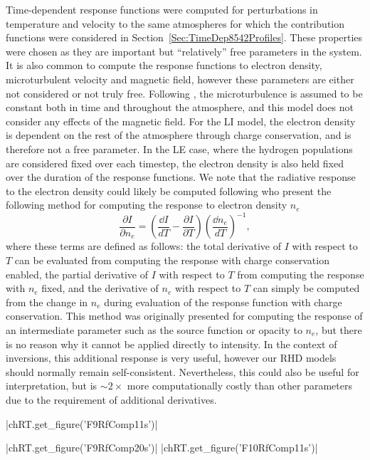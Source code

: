 Time-dependent response functions were computed for perturbations in temperature and velocity to the same atmospheres for which the contribution functions were considered in Section~\ref{Sec:TimeDep8542Profiles}.
These properties were chosen as they are important but ``relatively'' free parameters in the system.
It is also common to compute the response functions to electron density, microturbulent velocity and magnetic field, however these parameters are either not considered or not truly free.
Following \Radyn{}, the microturbulence is assumed to be constant both in time and throughout the atmosphere, and this model does not consider any effects of the magnetic field.
For the LI model, the electron density is dependent on the rest of the atmosphere through charge conservation, and is therefore not a free parameter.
In the LE case, where the hydrogen populations are considered fixed over each timestep, the electron density is also held fixed over the duration of the response functions.
We note that the radiative response to the electron density could likely be computed following \citet{Metcalf1990a} who present the following method for computing the response to electron density $n_e$
\begin{equation}
    \frac{\partial I}{\partial n_e} = \left( \frac{\dd{}I}{dT} - \frac{\partial I}{\partial T} \right)\left( \frac{\dd{}n_e}{dT} \right)^{-1},
\end{equation}
where these terms are defined as follows: the total derivative of $I$ with respect to $T$ can be evaluated from computing the response with charge conservation enabled, the partial derivative of $I$ with respect to $T$ from computing the response with $n_e$ fixed, and the derivative of $n_e$ with respect to $T$ can simply be computed from the change in $n_e$ during evaluation of the response function with charge conservation.
This method was originally presented for computing the response of an intermediate parameter such as the source function or opacity to $n_e$, but there is no reason why it cannot be applied directly to intensity.
In the context of inversions, this additional response is very useful, however our RHD models should normally remain self-consistent.
Nevertheless, this could also be useful for interpretation, but is $\sim2\times$ more computationally costly than other parameters due to the requirement of additional derivatives.

\py[TimeDepRT]|chRT.get_figure('F9RfComp11s')|

\py[TimeDepRT]|chRT.get_figure('F9RfComp20s')|
\py[TimeDepRT]|chRT.get_figure('F10RfComp11s')|

